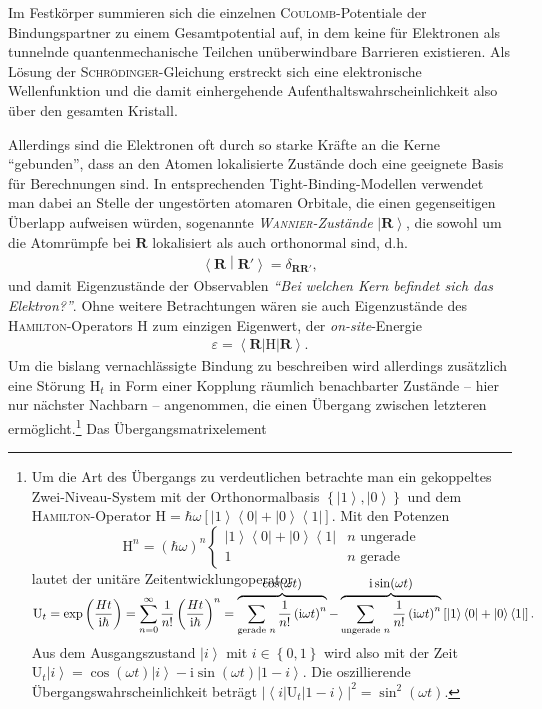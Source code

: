 \documentclass[a4paper, 10pt, twoside, openany]{book} %
\newcommand \bra[1]{\left \langle #1 \right |}
\newcommand \ket[1]{\left | #1 \right \rangle}
\newcommand \bracket[2]{\left \langle #1 \middle | #2 \right \rangle}
\newcommand \parens[1]{\left ( #1 \right )}
\newcommand \bracks[1]{\left [ #1 \right ]}
\newcommand \braces[1]{\left \lbrace #1 \right \rbrace}
\def \I {\mathrm i}
\def \epsilon {\varepsilon}
\def \vec {\boldsymbol}
\newcommand \op[1]{\mathrm{#1}}
\begin{document}
	Im Festkörper summieren sich die einzelnen \textsc{Coulomb}-Potentiale der Bindungspartner zu einem Gesamtpotential auf, in dem keine für Elektronen als tunnelnde quantenmechanische Teilchen unüberwindbare Barrieren existieren. Als Lösung der \textsc{Schrödinger}-Gleichung erstreckt sich eine elektronische Wellenfunktion und die damit einhergehende Aufenthaltswahrscheinlichkeit also über den gesamten Kristall.
	
	Allerdings sind die Elektronen oft durch so starke Kräfte an die Kerne "`gebunden"', dass an den Atomen lokalisierte Zustände doch eine geeignete Basis für Berechnungen sind. In entsprechenden Tight-Binding-Modellen verwendet man dabei an Stelle der ungestörten atomaren Orbitale, die einen gegenseitigen Überlapp aufweisen würden, sogenannte \emph{\textsc{Wannier}-Zustände} $\ket{\vec R}$, die sowohl um die Atomrümpfe bei $\vec R$ lokalisiert als auch orthonormal sind, d.h.
	\begin{align}
		\bracket{\vec R}{\vec R'} = \delta_{\vec R \vec R'},
		\label{orthogonale R}
	\end{align}
	und damit Eigenzustände der Observablen \emph{"`Bei welchen Kern befindet sich das Elektron?"'}. Ohne weitere Betrachtungen wären sie auch Eigenzustände des \textsc{Hamilton}-Operators $\op H$ zum einzigen Eigenwert, der \emph{on-site}-Energie
	\begin{align*}
		\epsilon = \bra{\vec R} \op H \ket{\vec R}.
	\end{align*}
	Um die bislang vernachlässigte Bindung zu beschreiben wird allerdings zusätzlich eine Störung $\op H_t$ in Form einer Kopplung räumlich benachbarter Zustände -- hier nur nächster Nachbarn -- angenommen, die einen Übergang zwischen letzteren ermöglicht.\footnote{Um die Art des Übergangs zu verdeutlichen betrachte man ein gekoppeltes Zwei-Niveau-System mit der Orthonormalbasis $\braces{\ket 1, \ket 0}$ und dem \textsc{Hamilton}-Operator $\op H = \hbar \omega \bracks{\ket 1 \bra 0 + \ket 0 \bra 1}$. Mit den Potenzen $$\op H^n = (\hbar \omega)^n \begin{cases} \ket 1 \bra 0 + \ket 0 \bra 1 & \text{$n$ ungerade} \\ 1 & \text{$n$ gerade} \end{cases}$$ lautet der unitäre Zeitentwicklungoperator $$\op U_t = \exp \parens{\frac{H t}{\I \hbar}} = \sum_{n = 0}^\infty \frac 1 {n!} \parens{\frac{H t}{\I \hbar}}^n = \smash{\overbrace{\sum_\text{gerade $n$} \frac 1 {n!} \parens{\I \omega  t}^n}^{\displaystyle \cos(\omega t)} - \overbrace{\sum_\text{ungerade $n$} \frac{1}{n!} \parens{\I \omega t}^n}^{\displaystyle \I \sin(\omega t)}} \bracks{\ket 1 \bra 0 + \ket 0 \bra 1}.$$ Aus dem Ausgangszustand $\ket i$ mit $i \in \braces{0, 1}$ wird also mit der Zeit $\op U_t \ket i = \cos(\omega t) \ket i - \I \sin(\omega t) \ket{1 - i}$. Die oszillierende Übergangswahrscheinlichkeit beträgt $|\bra i \op U_t \ket{1 - i}|^2 = \sin^2(\omega t).$} Das Übergangsmatrixelement
\end{document}
